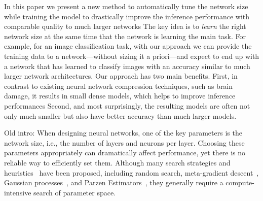 \documentclass[sigconf]{acmart}
\newcommand{\srm}[1]{\textcolor{red}{{\bf Sam:} #1}}
\newcommand{\gl}[1]{\textcolor{violet}{{\bf Gl:} #1}}
\begin{document}
In this paper we present a new method to automatically tune the network size while training the model to drastically improve the inference performance with comparable quality to much larger networks  
The key idea is to
\emph{learn} the right network size at the same time that the network is
learning the main task. For example, for an image classification task, with our approach we can provide the training data to a network---without sizing it a priori---and expect to end up with a network that has learned to classify images with an accuracy similar to much larger network architectures.
Our approach has two main benefits. 
First, in contrast to existing neural network compression techniques, such as brain damage, it results in small dense models, which helps to improve inference performances
Second, and most surprisingly, the resulting models are often not only much smaller but also have better accuracy than much larger models. 

Old intro:
When designing neural networks, one of the key parameters is the network size, i.e., 
the number of layers and neurons per layer.  Choosing these parameters appropriately
can dramatically affect performance, yet
there is no reliable way to efficiently set them. Although many search
 strategies and heuristics~\cite{Bengio2012a} have been proposed, including
random search,
meta-gradient descent~\cite{Pedregosa2016},
Gaussian processes~\cite{Bergstra2011a}, and Parzen Estimators~\cite{Bergstra2011a}, 
 they generally require a compute-intensive
search of parameter space.

\end{document}
